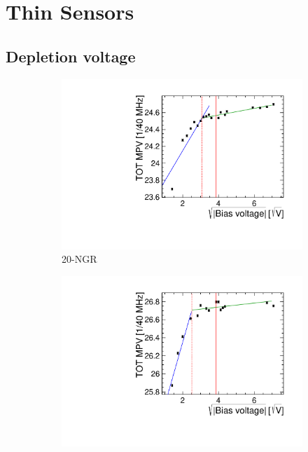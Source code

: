 \chapter{Thin Sensors}
\label{sec:appendix_ThinSensors}

\section{Depletion voltage}

\begin{figure}[htbp] \centering
  \begin{subfigure}[b]{0.33\textwidth}
    \includegraphics[width=\textwidth]{./figures/TestBeam/depletionVoltage_W0019_G07.pdf}
    \caption{20-NGR}
  \end{subfigure} \hfill
  \begin{subfigure}[b]{0.33\textwidth}
    \includegraphics[width=\textwidth]{./figures/TestBeam/depletionVoltage_W0019_F07.pdf}

\end{subfigure}
\end{figure}
